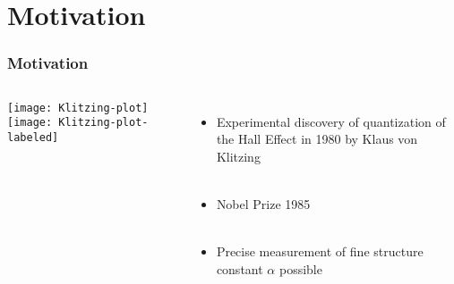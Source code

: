 \section{Motivation}

\begin{frame}
\frametitle{Motivation}
\begin{columns}
	\column{5cm}
	\begin{overprint}
		\texttt{[image: Klitzing-plot]}
		\onslide<2>\texttt{[image: Klitzing-plot-labeled]}
	\end{overprint}
	
	\column{6cm}
	\begin{itemize}
		\item Experimental discovery of quantization of the Hall Effect in 1980 by Klaus von Klitzing\\\ \\
		
		\item Nobel Prize 1985\\\ \\
		
		\item Precise measurement of fine structure constant $\alpha$ possible
	\end{itemize}
	
\end{columns}


\end{frame}





